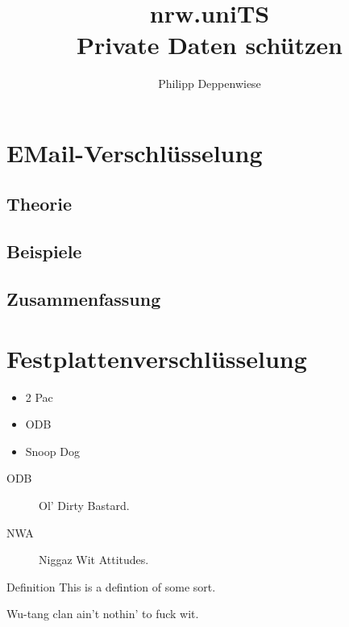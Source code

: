 \documentclass[xetex,mathserif,serif]{beamer}
\title{\textbf{nrw.uniTS}\\ Private Daten schützen}
\author{Philipp Deppenwiese}
\begin{document}
	\frame{\titlepage}
	\begin{frame}
		\tableofcontents
	\end{frame}
	\section{EMail-Verschlüsselung}
	\subsection{Theorie}
		\begin{frame}
		\blindtext
		\end{frame}
	\subsection{Beispiele}
		\begin{frame}
		\blindtext
		\end{frame}
	\subsection{Zusammenfassung}
		\begin{frame}
		\blindtext
		\end{frame}
	\section{Festplattenverschlüsselung}



	\begin{frame}
		\begin{itemize}
			\item 2 Pac
			\item ODB
			\item Snoop Dog
		\end{itemize}
	\end{frame}

	\begin{frame}
		\begin{description}
			\item[ODB] Ol' Dirty Bastard.
			\item[NWA] Niggaz Wit Attitudes.
		\end{description}
		\end{frame}

	\begin{frame}
		\begin{block}{Definition}
			This is a defintion of some sort.
		\end{block}
	\end{frame}

	\begin{frame}
		\begin{theorem}[RZA, 1993]
			Wu-tang clan ain't nothin' to fuck wit.
		\end{theorem}
	\end{frame}
\end{document}
